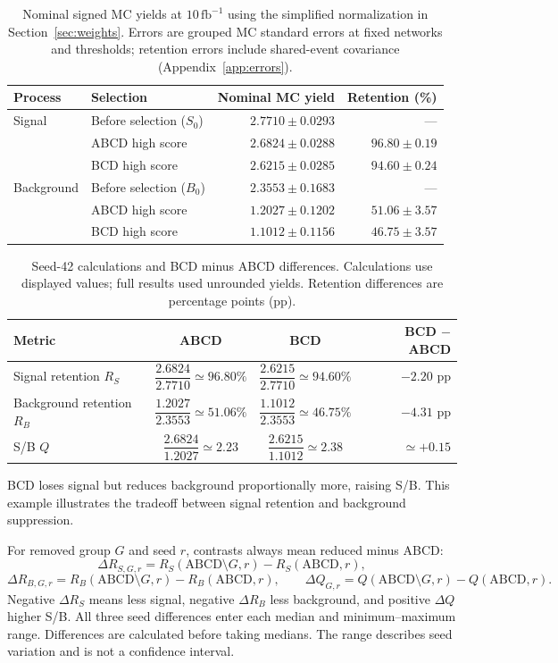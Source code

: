 \documentclass[11pt,a4paper]{article}
\begin{document}
\begin{table}[H]
\caption{Nominal signed MC yields at $10\,\mathrm{fb}^{-1}$ using the simplified normalization in Section~\ref{sec:weights}. Errors are grouped MC standard errors at fixed networks and thresholds; retention errors include shared-event covariance (Appendix~\ref{app:errors}).}
\label{tab:yields}
\centering
\begin{tabular}{llrr}
\toprule
Process & Selection & Nominal MC yield & Retention (\%) \\
\midrule
Signal & Before selection ($S_0$) & $2.7710\pm0.0293$ & --- \\
 & ABCD high score & $2.6824\pm0.0288$ & $96.80\pm0.19$ \\
 & BCD high score & $2.6215\pm0.0285$ & $94.60\pm0.24$ \\
Background & Before selection ($B_0$) & $2.3553\pm0.1683$ & --- \\
 & ABCD high score & $1.2027\pm0.1202$ & $51.06\pm3.57$ \\
 & BCD high score & $1.1012\pm0.1156$ & $46.75\pm3.57$ \\
\bottomrule
\end{tabular}
\end{table}

\begin{table}[H]
\caption{Seed-42 calculations and BCD minus ABCD differences. Calculations use displayed values; full results used unrounded yields. Retention differences are percentage points (pp).}
\label{tab:worked-metrics}
\centering\small
\renewcommand{\arraystretch}{2.6}
\begin{tabular}{lccr}
\toprule
Metric & ABCD & BCD & BCD $-$ ABCD \\
\midrule
Signal retention $R_S$ & $\dfrac{2.6824}{2.7710}\simeq96.80\%$ & $\dfrac{2.6215}{2.7710}\simeq94.60\%$ & $-2.20$ pp \\
Background retention $R_B$ & $\dfrac{1.2027}{2.3553}\simeq51.06\%$ & $\dfrac{1.1012}{2.3553}\simeq46.75\%$ & $-4.31$ pp \\
S/B $Q$ & $\dfrac{2.6824}{1.2027}\simeq2.23$ & $\dfrac{2.6215}{1.1012}\simeq2.38$ & $\simeq+0.15$ \\
\bottomrule
\end{tabular}
\end{table}
BCD loses signal but reduces background proportionally more, raising S/B. This example illustrates the tradeoff between signal retention and background suppression.

For removed group $G$ and seed $r$, contrasts always mean reduced minus ABCD:
\[
 \Delta R_{S,G,r}=R_S(\mathrm{ABCD}\setminus G,r)-R_S(\mathrm{ABCD},r),
\]
\[
 \Delta R_{B,G,r}=R_B(\mathrm{ABCD}\setminus G,r)-R_B(\mathrm{ABCD},r),\qquad
 \Delta Q_{G,r}=Q(\mathrm{ABCD}\setminus G,r)-Q(\mathrm{ABCD},r).
\]
Negative $\Delta R_S$ means less signal, negative $\Delta R_B$ less background, and positive $\Delta Q$ higher S/B.
All three seed differences enter each median and minimum--maximum range. Differences are calculated before taking medians.
The range describes seed variation and is not a confidence interval.
\end{document}
